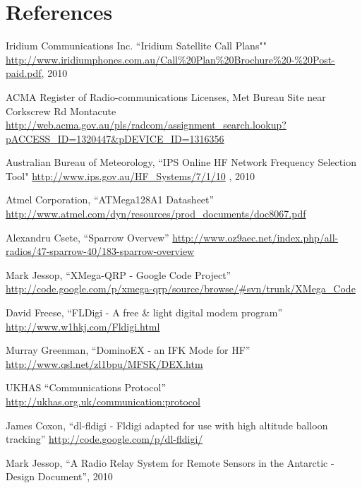 \documentclass[a4paper,12pt]{article}
\begin{document}
\section*{References}
\renewcommand*{\refname}{\vspace*{-12mm}}
\begin{thebibliography}{99}
Iridium Communications Inc. ``Iridium Satellite Call Plans"" \url{http://www.iridiumphones.com.au/Call\%20Plan\%20Brochure\%20-\%20Post-paid.pdf}, 2010

ACMA Register of Radio-communications Licenses, Met Bureau Site near Corkscrew Rd Montacute \url{http://web.acma.gov.au/pls/radcom/assignment\_search.lookup?pACCESS\_ID=1320447&pDEVICE\_ID=1316356}

Australian Bureau of Meteorology, ``IPS Online HF Network Frequency Selection Tool" \url{http://www.ips.gov.au/HF\_Systems/7/1/10} , 2010 %

Atmel Corporation, ``ATMega128A1 Datasheet'' \url{http://www.atmel.com/dyn/resources/prod_documents/doc8067.pdf}

Alexandru Csete, ``Sparrow Overvew'' \url{http://www.oz9aec.net/index.php/all-radios/47-sparrow-40/183-sparrow-overview}

Mark Jessop, ``XMega-QRP - Google Code Project'' \url{http://code.google.com/p/xmega-qrp/source/browse/#svn/trunk/XMega_Code}

David Freese, ``FLDigi - A free \& light digital modem program'' \url{http://www.w1hkj.com/Fldigi.html}

Murray Greenman, ``DominoEX - an IFK Mode for HF'' 
\url{http://www.qsl.net/zl1bpu/MFSK/DEX.htm}

UKHAS ``Communications Protocol''
\url{http://ukhas.org.uk/communication:protocol}

James Coxon, ``dl-fldigi - Fldigi adapted for use with high altitude balloon tracking'' \url{http://code.google.com/p/dl-fldigi/}

Mark Jessop, ``A Radio Relay System for Remote Sensors in the Antarctic - Design Document'', 2010

\end{thebibliography}
\end{document}
